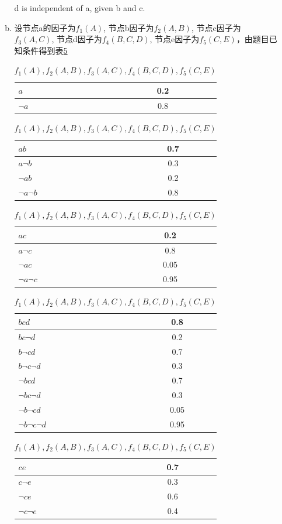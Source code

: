 \documentclass[a4paper, 11pt]{article}
\begin{document}
\begin{enumerate}
\begin{enumerate}[(a)]
      d is independent of a, given b and c.
      \item
      设节点a的因子为$f_{1}(A)$, 节点b因子为$f_{2}(A,B)$, 节点c因子为
      $f_{3}(A,C)$, 节点d因子为$f_{4}(B,C,D)$, 节点e因子为$f_{5}(C,E)$，由题目已知条件得到表\ref{Q3T1}\\
      \begin{table}[htbp]
        \centering
        \begin{tabular}{|l|c|}
          \hline
          $a$&0.2\\
          \hline
          $\lnot a$&0.8\\
          \hline
        \end{tabular}
        \begin{tabular}{|l|c|}
          \hline
          $ab$&0.7\\
          \hline
          $a\lnot b$&0.3\\
          \hline
          $\lnot ab$&0.2\\
          \hline
          $\lnot a\lnot b$&0.8\\
          \hline
        \end{tabular}
        \begin{tabular}{|l|c|}
          \hline
          $ac$&0.2\\
          \hline
          $a\lnot c$&0.8\\
          \hline
          $\lnot ac$&0.05\\
          \hline
          $\lnot a\lnot c$&0.95\\
          \hline
        \end{tabular}
        \begin{tabular}{|l|c|}
          \hline
          $bcd$&0.8\\
          \hline
          $bc\lnot d$&0.2\\
          \hline
          $b\lnot cd$&0.7\\
          \hline
          $b\lnot c\lnot d$&0.3\\
          \hline
          $\lnot bcd$&0.7\\
          \hline
          $\lnot bc\lnot d$&0.3\\
          \hline
          $\lnot b \lnot cd$&0.05\\
          \hline
          $\lnot b \lnot c \lnot d$&0.95\\
          \hline
        \end{tabular}
        \begin{tabular}{|l|c|}
          \hline
          $ce$&0.7\\
          \hline
          $c\lnot e$&0.3\\
          \hline
          $\lnot ce$&0.6\\
          \hline
          $\lnot c\lnot e$&0.4\\
          \hline
        \end{tabular}
        \caption{$f_{1}(A), f_{2}(A,B),f_{3}(A,C),f_{4}(B,C,D),f_{5}(C,E)$}
        \label{Q3T1}
      \end{table}


\end{enumerate}
\end{enumerate}
\end{document}
